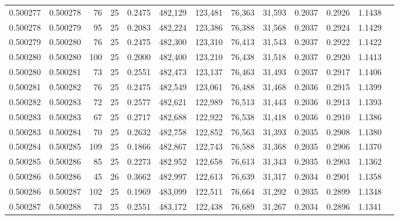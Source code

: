 \begin{tabular}{rrrrrrrrrrrrr}
0.500277 & 0.500278 &  76 &  25 &                                     0.2475 & 482,129 & 123,481 &  76,363 &  31,593 & 0.2037 & 0.2926 & 1.1438 \\
0.500278 & 0.500279 &  95 &  25 &                                     0.2083 & 482,224 & 123,386 &  76,388 &  31,568 & 0.2037 & 0.2924 & 1.1429 \\
0.500279 & 0.500280 &  76 &  25 &                                     0.2475 & 482,300 & 123,310 &  76,413 &  31,543 & 0.2037 & 0.2922 & 1.1422 \\
0.500280 & 0.500280 & 100 &  25 &                                     0.2000 & 482,400 & 123,210 &  76,438 &  31,518 & 0.2037 & 0.2920 & 1.1413 \\
0.500280 & 0.500281 &  73 &  25 &                                     0.2551 & 482,473 & 123,137 &  76,463 &  31,493 & 0.2037 & 0.2917 & 1.1406 \\
0.500281 & 0.500282 &  76 &  25 &                                     0.2475 & 482,549 & 123,061 &  76,488 &  31,468 & 0.2036 & 0.2915 & 1.1399 \\
0.500282 & 0.500283 &  72 &  25 &                                     0.2577 & 482,621 & 122,989 &  76,513 &  31,443 & 0.2036 & 0.2913 & 1.1393 \\
0.500283 & 0.500283 &  67 &  25 &                                     0.2717 & 482,688 & 122,922 &  76,538 &  31,418 & 0.2036 & 0.2910 & 1.1386 \\
0.500283 & 0.500284 &  70 &  25 &                                     0.2632 & 482,758 & 122,852 &  76,563 &  31,393 & 0.2035 & 0.2908 & 1.1380 \\
0.500284 & 0.500285 & 109 &  25 &                                     0.1866 & 482,867 & 122,743 &  76,588 &  31,368 & 0.2035 & 0.2906 & 1.1370 \\
0.500285 & 0.500286 &  85 &  25 &                                     0.2273 & 482,952 & 122,658 &  76,613 &  31,343 & 0.2035 & 0.2903 & 1.1362 \\
0.500286 & 0.500286 &  45 &  26 &                                     0.3662 & 482,997 & 122,613 &  76,639 &  31,317 & 0.2034 & 0.2901 & 1.1358 \\
0.500286 & 0.500287 & 102 &  25 &                                     0.1969 & 483,099 & 122,511 &  76,664 &  31,292 & 0.2035 & 0.2899 & 1.1348 \\
0.500287 & 0.500288 &  73 &  25 &                                     0.2551 & 483,172 & 122,438 &  76,689 &  31,267 & 0.2034 & 0.2896 & 1.1341 \\

\end{tabular}
